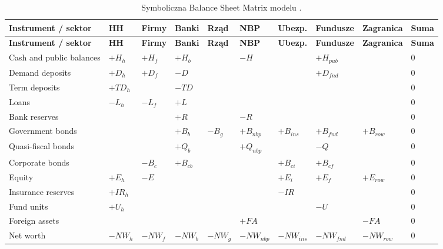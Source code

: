\begin{landscape}
\scriptsize
\begin{longtable}{@{}L{3.4cm}*{9}{C{1.45cm}}@{}}
\caption{Symboliczna Balance Sheet Matrix modelu \amor{}.}
\label{tab:appendix-bsm}\\
\toprule
\textbf{Instrument / sektor} & \textbf{HH} & \textbf{Firmy} & \textbf{Banki} & \textbf{Rząd} & \textbf{NBP} & \textbf{Ubezp.} & \textbf{Fundusze} & \textbf{Zagranica} & \textbf{Suma} \\
\midrule
\endfirsthead
\toprule
\textbf{Instrument / sektor} & \textbf{HH} & \textbf{Firmy} & \textbf{Banki} & \textbf{Rząd} & \textbf{NBP} & \textbf{Ubezp.} & \textbf{Fundusze} & \textbf{Zagranica} & \textbf{Suma} \\
\midrule
\endhead
Cash and public balances & $+H_h$ & $+H_f$ & $+H_b$ &  & $-H$ &  & $+H_{pub}$ &  & $0$ \\
Demand deposits & $+D_h$ & $+D_f$ & $-D$ &  &  &  & $+D_{fnd}$ &  & $0$ \\
Term deposits & $+TD_h$ &  & $-TD$ &  &  &  &  &  & $0$ \\
Loans & $-L_h$ & $-L_f$ & $+L$ &  &  &  &  &  & $0$ \\
Bank reserves &  &  & $+R$ &  & $-R$ &  &  &  & $0$ \\
Government bonds &  &  & $+B_b$ & $-B_g$ & $+B_{nbp}$ & $+B_{ins}$ & $+B_{fnd}$ & $+B_{row}$ & $0$ \\
Quasi-fiscal bonds &  &  & $+Q_b$ &  & $+Q_{nbp}$ &  & $-Q$ &  & $0$ \\
Corporate bonds &  & $-B_c$ & $+B_{cb}$ &  &  & $+B_{ci}$ & $+B_{cf}$ &  & $0$ \\
Equity & $+E_h$ & $-E$ &  &  &  & $+E_i$ & $+E_f$ & $+E_{row}$ & $0$ \\
Insurance reserves & $+IR_h$ &  &  &  &  & $-IR$ &  &  & $0$ \\
Fund units & $+U_h$ &  &  &  &  &  & $-U$ &  & $0$ \\
Foreign assets &  &  &  &  & $+FA$ &  &  & $-FA$ & $0$ \\
Net worth & $-NW_h$ & $-NW_f$ & $-NW_b$ & $-NW_g$ & $-NW_{nbp}$ & $-NW_{ins}$ & $-NW_{fnd}$ & $-NW_{row}$ & $0$ \\
\bottomrule
\end{longtable}
\end{landscape}


